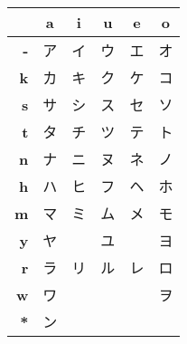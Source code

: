 \bigskip
\begin{center}
\Padding
\begin{tabular}{r||c|c|c|c|c|}
             & \textbf{a}& \textbf{i}& \textbf{u}& \textbf{e}& \textbf{o}\\ \hline \hline
\textbf{-}&ア&イ&ウ&エ&オ\\\hline 
\textbf{k}&カ&キ&ク&ケ&コ\\\hline 
\textbf{s}&サ&シ&ス&セ&ソ\\\hline 
\textbf{t}&タ&チ&ツ&テ&ト\\\hline 
\textbf{n}&ナ&ニ&ヌ&ネ&ノ\\\hline 
\textbf{h}&ハ&ヒ&フ&ヘ&ホ\\\hline 
\textbf{m}&マ&ミ&ム&メ&モ\\\hline 
\textbf{y}&ヤ&  &ユ&  &ヨ\\\hline 
\textbf{r}&ラ&リ&ル&レ&ロ\\\hline 
\textbf{w}&ワ&  &  &  &ヲ\\\hline 
\textbf{*}&ン&  &  &  &  \\\hline 
\end{tabular}
\end{center}

